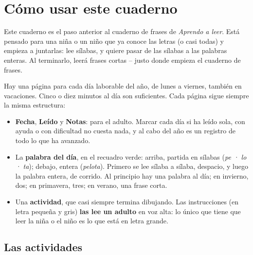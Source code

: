 \section*{Cómo usar este cuaderno}

Este cuaderno es el paso anterior al cuaderno de frases de
\emph{Aprendo a leer}. Está pensado para una niña o un niño que ya
conoce las letras (o casi todas) y empieza a juntarlas: lee sílabas, y
quiere pasar de las sílabas a las palabras enteras. Al terminarlo,
leerá frases cortas -- justo donde empieza el cuaderno de frases.

Hay una página para cada día laborable del año, de lunes a viernes,
también en vacaciones. Cinco o diez minutos al día son suficientes.
Cada página sigue siempre la misma estructura:

\begin{itemize}[leftmargin=6mm]
\item \textbf{Fecha}, \textbf{Leído} y \textbf{Notas}: para el adulto.
  Marcar cada día si ha leído sola, con ayuda o con dificultad no
  cuesta nada, y al cabo del año es un registro de todo lo que ha
  avanzado.
\item La \textbf{palabra del día}, en el recuadro verde: arriba,
  partida en sílabas (\emph{pe · lo · ta}); debajo, entera
  (\emph{pelota}). Primero se lee sílaba a sílaba, despacio, y luego
  la palabra entera, de corrido. Al principio hay una palabra al día;
  en invierno, dos; en primavera, tres; en verano, una frase corta.
\item Una \textbf{actividad}, que casi siempre termina dibujando. Las
  instrucciones (en letra pequeña y gris) \textbf{las lee un adulto} en
  voz alta: lo único que tiene que leer la niña o el niño es lo que
  está en letra grande.
\end{itemize}

\subsection*{Las actividades}


